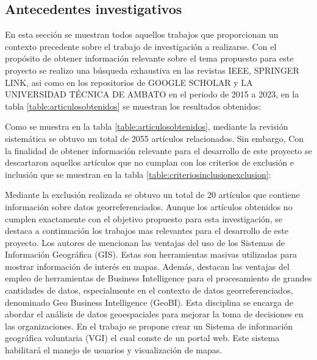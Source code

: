 \subsection{Antecedentes investigativos}
En esta sección se muestran todos aquellos trabajos que proporcionan un contexto
precedente sobre el trabajo de investigación a realizarse.
\bigbreak
Con el propósito de obtener información relevante sobre el tema propuesto para este proyecto se realizo una
búsqueda exhaustiva en las revistas IEEE, SPRINGER LINK, asi como en los repositorios de GOOGLE SCHOLAR
y LA UNIVERSIDAD TÉCNICA DE AMBATO en el periodo de 2015 a 2023, en la tabla \ref{table:articulosobtenidos}
se muestran los resultados
obtenidos:

Como se muestra en la tabla \ref{table:articulosobtenidos}, mediante la revisión sistemática se obtuvo un total de 2055 artículos relacionados.
Sin embargo, Con la finalidad de obtener información relevante para el desarrollo de este proyecto se descartaron
aquellos artículos que no cumplan con los criterios de exclusión e inclusión que se muestran en la tabla \ref{table:criteriosinclusionexclusion}:

\newpage
Mediante la exclusión realizada se obtuvo un total de 20 artículos que contiene información sobre datos georreferenciados.
Aunque los artículos obtenidos no cumplen exactamente con el objetivo propuesto para esta investigación, se destaca a continuación
los trabajos mas relevantes para el desarrollo de este proyecto.
\bigbreak
Los autores de \cite{herreraGeoBIBigVGI2015} mencionan las ventajas del uso de los Sistemas de Información Geográfica (GIS).
Estas son herramientas masivas utilizadas para mostrar información de interés en mapas. Además, destacan las ventajas del empleo de
herramientas de Business Intelligence para el procesamiento de grandes cantidades de datos, especialmente en el contexto de
datos georreferenciados, denominado Geo Business Intelligence (GeoBI). Esta disciplina se encarga de abordar el análisis de datos
geoespaciales para mejorar la toma de decisiones en las organizaciones. En el trabajo se propone crear un Sistema de información
geográfica voluntaria (VGI) el cual conste de un portal web. Este sistema habilitará el manejo de usuarios y visualización de mapas.
